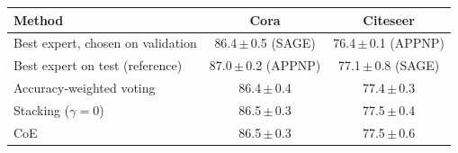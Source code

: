\begin{tabular}{l cc}
\toprule
Method & Cora & Citeseer \\
\midrule
Best expert, chosen on validation & 86.4\,$\pm$\,0.5 (SAGE) & 76.4\,$\pm$\,0.1 (APPNP) \\
Best expert on test (reference) & 87.0\,$\pm$\,0.2 (APPNP) & 77.1\,$\pm$\,0.8 (SAGE) \\
Accuracy-weighted voting & 86.4\,$\pm$\,0.4 & 77.4\,$\pm$\,0.3 \\
Stacking ($\gamma=0$) & 86.5\,$\pm$\,0.3 & 77.5\,$\pm$\,0.4 \\
CoE & 86.5\,$\pm$\,0.3 & 77.5\,$\pm$\,0.6 \\
\bottomrule
\end{tabular}
